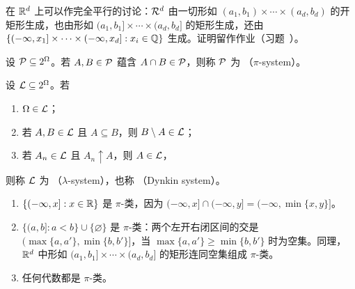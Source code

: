 在 $\mathbb{R}^d$ 上可以作完全平行的讨论：$\mathcal{R}^d$ 由一切形如 $(a_1,b_1)\times\cdots\times(a_d,b_d)$ 的开矩形生成，也由形如 $(a_1,b_1]\times\cdots\times(a_d,b_d]$ 的矩形生成，还由 $\{(-\infty,x_1]\times\cdots\times(-\infty,x_d]: x_i\in\mathbb{Q}\}$ 生成。证明留作作业（习题~）。


\begin{definition}[$\pi$-类]\label{def:set-systems:pi}
设 $\mathcal{P}\subseteq2^\Omega$。若 $A,B\in\mathcal{P}$ 蕴含 $A\cap B\in\mathcal{P}$，则称 $\mathcal{P}$ 为 （$\pi$-system）。
\end{definition}

\begin{definition}[$\lambda$-类]\label{def:set-systems:lambda}
设 $\mathcal{L}\subseteq2^\Omega$。若
\begin{enumerate}
\item $\Omega\in\mathcal{L}$；
\item 若 $A,B\in\mathcal{L}$ 且 $A\subseteq B$，则 $B\setminus A\in\mathcal{L}$；
\item 若 $A_n\in\mathcal{L}$ 且 $A_n\uparrow A$，则 $A\in\mathcal{L}$，
\end{enumerate}
则称 $\mathcal{L}$ 为 （$\lambda$-system），也称 （Dynkin system）。
\end{definition}

\begin{example}[$\pi$-类]\label{ex:set-systems:pi-examples}
\begin{enumerate}
\item $\{(-\infty,x]: x\in\mathbb{R}\}$ 是 $\pi$-类，因为 $(-\infty,x]\cap(-\infty,y]=(-\infty,\min\{x,y\}]$。
\item $\{(a,b]: a<b\}\cup\{\varnothing\}$ 是 $\pi$-类：两个左开右闭区间的交是 $(\max\{a,a'\},\min\{b,b'\}]$，当 $\max\{a,a'\}\geqslant\min\{b,b'\}$ 时为空集。同理，$\mathbb{R}^d$ 中形如 $(a_1,b_1]\times\cdots\times(a_d,b_d]$ 的矩形连同空集组成 $\pi$-类。
\item 任何代数都是 $\pi$-类。
\end{enumerate}
\end{example}

